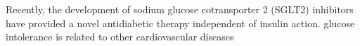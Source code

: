 \documentclass[utf8]{frontiersSCNS} %
\begin{document}
Recently, the development of sodium glucose cotransporter 2 (SGLT2) inhibitors have provided a novel antidiabetic therapy independent of insulin action. 
glucose intolerance is related to other cardiovascular diseases








\end{document}
